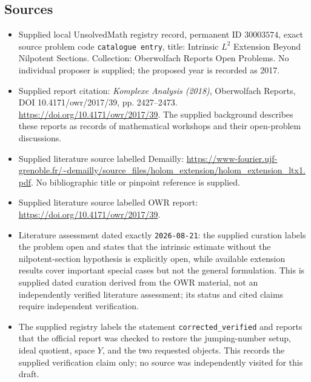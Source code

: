 \documentclass[11pt]{article}
\begin{document}
\subsection{Sources}
\begin{itemize}
\item Supplied local UnsolvedMath registry record, permanent ID \(30003574\), exact source problem code \texttt{catalogue entry}, title: Intrinsic \(L^2\) Extension Beyond Nilpotent Sections. Collection: Oberwolfach Reports Open Problems. No individual proposer is supplied; the proposed year is recorded as 2017.
\item Supplied report citation: \emph{Komplexe Analysis (2018)}, Oberwolfach Reports, DOI 10.4171/owr/2017/39, pp. 2427--2473. \url{https://doi.org/10.4171/owr/2017/39}. The supplied background describes these reports as records of mathematical workshops and their open-problem discussions.
\item Supplied literature source labelled Demailly: \url{https://www-fourier.ujf-grenoble.fr/~demailly/source_files/holom_extension/holom_extension_ltx1.pdf}. No bibliographic title or pinpoint reference is supplied.
\item Supplied literature source labelled OWR report: \url{https://doi.org/10.4171/owr/2017/39}.
\item Literature assessment dated exactly \texttt{2026-08-21}: the supplied curation labels the problem open and states that the intrinsic estimate without the nilpotent-section hypothesis is explicitly open, while available extension results cover important special cases but not the general formulation. This is supplied dated curation derived from the OWR material, not an independently verified literature assessment; its status and cited claims require independent verification.
\item The supplied registry labels the statement \texttt{corrected\_verified} and reports that the official report was checked to restore the jumping-number setup, ideal quotient, space \(Y\), and the two requested objects. This records the supplied verification claim only; no source was independently visited for this draft.
\end{itemize}
\end{document}
